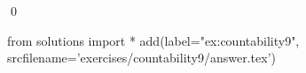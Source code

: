 
\begin{ex} 
  \label{ex:countability9}
  
  \qed
\end{ex} 
\begin{python0}
from solutions import *
add(label="ex:countability9",
    srcfilename='exercises/countability9/answer.tex') 
\end{python0}
